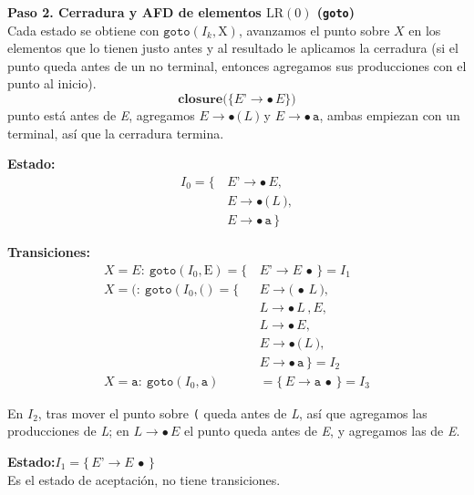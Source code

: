 \documentclass[12pt,letterpaper]{article}
\newcommand{\nt}[1]{\textit{#1}}
\newcommand{\tk}[1]{\texttt{#1}}
\newcommand{\tx}[1]{\text{#1}}
\newcommand{\lrc}{\mathrm{LR(0)}}
\begin{document}
\begin{enumerate}[label=\arabic*.]
  \textbf{Paso 2. Cerradura y AFD de elementos $\lrc$ (\texttt{goto})}\\
  Cada estado se obtiene con $\texttt{goto}(I_k, \tx{X})$, avanzamos el punto sobre $X$ en los elementos que lo
  tienen justo antes y al resultado le aplicamos la cerradura (si el punto queda antes de un no terminal,
  entonces agregamos sus producciones con el punto al inicio).\\
  \[
  \textbf{closure}\big(\{\nt{E'}\to\bullet\,\nt{E}\}\big)
  \]
  punto está antes de \nt{E}, agregamos $\nt{E}\to\bullet\,\tk{(}\,\nt{L}\,\tk{)}$ y $\nt{E}\to\bullet\,\tk{a}$,
  ambas empiezan con un terminal, así que la cerradura termina.

  \medskip

  \textbf{Estado:}
  \[
  \begin{aligned}
    I_0 = \{\, & \nt{E'}\to\bullet\,\nt{E},\\
               & \nt{E}\to\bullet\,\tk{(}\,\nt{L}\,\tk{)},\\
               & \nt{E}\to\bullet\,\tk{a}\,\}
  \end{aligned}
  \]

  \textbf{Transiciones:}
  \[
  \begin{aligned}
    X=\nt{E}:\ \texttt{goto}(I_0,\tx{E}) = \{\, & \nt{E'}\to\nt{E}\,\bullet\,\} = \boxed{I_1}\\[8pt]
    X=\tk{(}:\ \texttt{goto}(I_0,\tk{(}) = \{\, & \nt{E}\to\tk{(}\,\bullet\,\nt{L}\,\tk{)},\\
                                                & \nt{L}\to\bullet\,\nt{L}\,\tk{,}\,\nt{E},\\
                                                & \nt{L}\to\bullet\,\nt{E},\\
                                                & \nt{E}\to\bullet\,\tk{(}\,\nt{L}\,\tk{)},\\
                                                & \nt{E}\to\bullet\,\tk{a}\,\} = \boxed{I_2}\\[8pt]
    X=\tk{a}:\ \texttt{goto}(I_0,\tk{a}) &= \{\,\nt{E}\to\tk{a}\,\bullet\,\} = \boxed{I_3}
  \end{aligned}
  \]
  
  En $I_2$, tras mover el punto sobre \tk{(} queda antes de \nt{L}, así que agregamos las producciones de \nt{L};
  en $\nt{L}\to\bullet\,\nt{E}$ el punto queda antes de \nt{E}, y agregamos las de \nt{E}.

  \medskip

  \textbf{Estado:}\quad $I_1 = \{\,\nt{E'}\to\nt{E}\,\bullet\,\}$\\
  Es el estado de aceptación, no tiene transiciones.


\end{enumerate}
\end{document}
